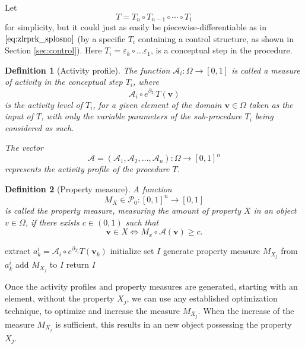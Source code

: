 \documentclass[smallcondensed]{svjour3}
\newcommand{\vv}{\mathbf{v}}
\newcommand{\dP}{\mathcal{P}}
\newcommand{\D}{\partial}
\newtheorem{definicija}{Definition}[section]
\begin{document}
   Let 
   $$T=T_n\circ T_{n-1}\circ\cdots\circ T_1$$
   for simplicity, but it could just as easily be piecewise-differentiable as in $\eqref{eq:zlrprk_splosno}$ (by a specific $T_i$ containing a control structure, as shown in Section \ref{sec:control}). Here $T_i=\varepsilon_k\circ\ldots \varepsilon_1$, is a conceptual step in the procedure.
  
   
   \begin{definicija}[Activity profile]
   The function $\mathcal{A}_i:\Omega\to[0,1]$ is called a \emph{measure of activity} in the conceptual step $T_i$, where 
   $$\mathcal{A}_i\circ e^{\D_{T_i}}T(\vv)$$ 
   is the \emph{activity level} of $T_i$, for a given element of the domain $\vv\in \Omega$ taken as the input of $T$, with only the variable parameters of the sub-procedure $T_i$ being considered as such.
   
   The vector $$\mathcal{A}=(\mathcal{A}_1,\mathcal{A}_2,\dots,\mathcal{A}_n):\Omega\to[0,1]^n$$ represents the activity profile of the procedure $T$. 
   \end{definicija}
   
   
   \begin{definicija}[Property measure]
    A function 
    $$M_X\in\dP_0:[0,1]^n\to[0,1]$$  
    is called the property measure, measuring the amount of property $X$ in an object $v\in\Omega$, if there exists  $c\in(0,1)$ such that 
    $$\vv\in X\iff M_x\circ\mathcal{A}(\vv)\ge c.$$
    \end{definicija}
   \vspace{-1cm}
   \begin{algorithm}[H]

     
   \caption{Construct property measure}
   \label{alg:propertyMeasure}
   \begin{algorithmic}[1]
   \For{each $\vv_k\in \Omega$}
   \State extract $a^i_k=\mathcal{A}_i\circ e^{\D_{T_i}}T(\vv_k)$
	\EndFor
	\EndFor
	\State initialize set $I$
   \State generate property measure $M_{X_j}$ from $a^i_k$
   \State add $M_{X_j}$ to $I$
   \EndFor
   \State return $I$
   \EndProcedure
   \end{algorithmic}
   \end{algorithm}
   
   Once the activity profiles and property measures are generated, starting with an element, without the property $X_j$, we can use any established optimization technique, to optimize and increase the measure $M_{X_j}$. When the increase of the measure $M_{X_j}$ is sufficient, this results in an new object possessing the property $X_j$.
   
\end{document}
